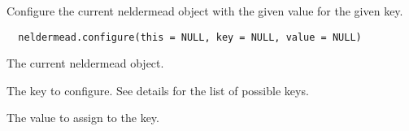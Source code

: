 %
\begin{Description}\relax
Configure the current neldermead object with the given value for the given
key.
\end{Description}
%
\begin{Usage}
\begin{verbatim}
  neldermead.configure(this = NULL, key = NULL, value = NULL)
\end{verbatim}
\end{Usage}
%
\begin{Arguments}
\begin{ldescription}
\item[\code{this}] The current neldermead object.
\item[\code{key}] The key to configure. See details for the list of possible keys.
\item[\code{value}] The value to assign to the key.
\end{ldescription}
\end{Arguments}
%
